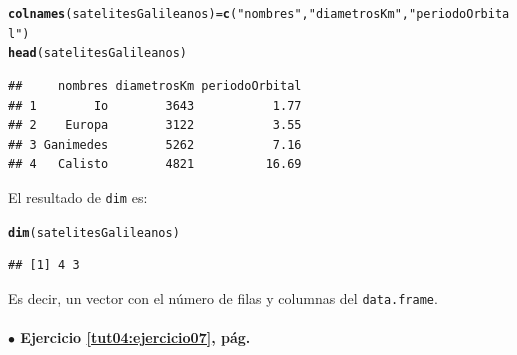 \documentclass[10pt,a4paper]{article}\usepackage[]{graphicx}\usepackage[]{color}
\makeatletter
\newcommand{\hlstr}[1]{\textcolor[rgb]{0.192,0.494,0.8}{#1}}%
\newcommand{\hlstd}[1]{\textcolor[rgb]{0.345,0.345,0.345}{#1}}%
\newcommand{\hlkwb}[1]{\textcolor[rgb]{0.69,0.353,0.396}{#1}}%
\newcommand{\hlkwd}[1]{\textcolor[rgb]{0.737,0.353,0.396}{\textbf{#1}}}%
\newenvironment{kframe}{%
 \def\at@end@of@kframe{}%
 \ifinner\ifhmode%
  \def\at@end@of@kframe{\end{minipage}}%
  \begin{minipage}{\columnwidth}%
 \fi\fi%
 \def\FrameCommand##1{\hskip\@totalleftmargin \hskip-\fboxsep
 \colorbox{shadecolor}{##1}\hskip-\fboxsep
     \hskip-\linewidth \hskip-\@totalleftmargin \hskip\columnwidth}%
 \MakeFramed {\advance\hsize-\width
   \@totalleftmargin\z@ \linewidth\hsize
   \@setminipage}}%
 {\par\unskip\endMakeFramed%
 \at@end@of@kframe}
\newenvironment{knitrout}{}{} %
\makeatother
\begin{document}
\begin{knitrout}
\color{fgcolor}\begin{kframe}
\begin{alltt}
\hlkwd{colnames}\hlstd{(satelitesGalileanos)} \hlkwb{=} \hlkwd{c}\hlstd{(}\hlstr{"nombres"}\hlstd{,} \hlstr{"diametrosKm"}\hlstd{,} \hlstr{"periodoOrbital"}\hlstd{)}
\hlkwd{head}\hlstd{(satelitesGalileanos)}
\end{alltt}
\begin{verbatim}
##     nombres diametrosKm periodoOrbital
## 1        Io        3643           1.77
## 2    Europa        3122           3.55
## 3 Ganimedes        5262           7.16
## 4   Calisto        4821          16.69
\end{verbatim}
\end{kframe}
\end{knitrout}
El resultado de {\tt dim} es:
\begin{knitrout}
\color{fgcolor}\begin{kframe}
\begin{alltt}
\hlkwd{dim}\hlstd{(satelitesGalileanos)}
\end{alltt}
\begin{verbatim}
## [1] 4 3
\end{verbatim}
\end{kframe}
\end{knitrout}
Es decir, un vector con el número de filas y columnas del {\tt data.frame}.

\paragraph{\bf $\bullet$ Ejercicio \ref{tut04:ejercicio07}, pág. \pageref{tut04:ejercicio07}}
\label{tut04:ejercicio07:sol}\quad\\
\end{document}
